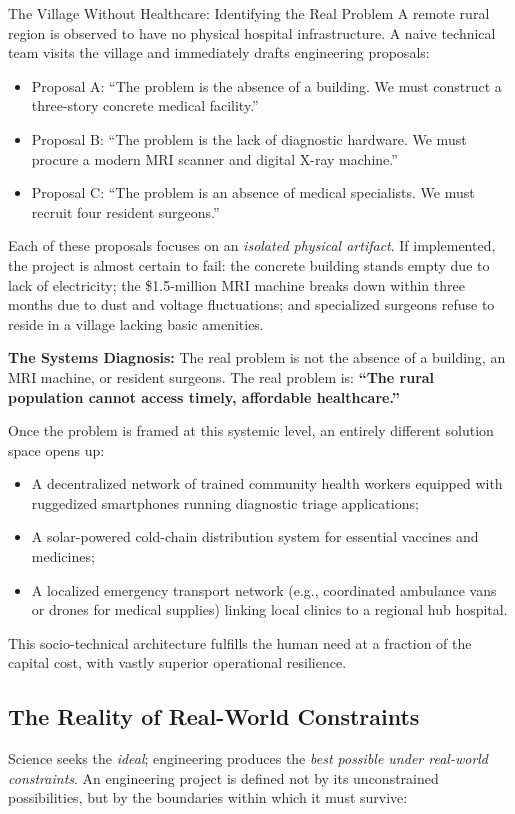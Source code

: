 \begin{storybox}{The Village Without Healthcare: Identifying the Real Problem}
A remote rural region is observed to have no physical hospital infrastructure. 
A naive technical team visits the village and immediately drafts engineering proposals:
\begin{itemize}[leftmargin=1.5em]
    \item Proposal A: ``The problem is the absence of a building. We must construct a three-story concrete medical facility.''
    \item Proposal B: ``The problem is the lack of diagnostic hardware. We must procure a modern MRI scanner and digital X-ray machine.''
    \item Proposal C: ``The problem is an absence of medical specialists. We must recruit four resident surgeons.''
\end{itemize}
Each of these proposals focuses on an \textit{isolated physical artifact}. If implemented, the project is almost certain to fail: the concrete building stands empty due to lack of electricity; the \$1.5-million MRI machine breaks down within three months due to dust and voltage fluctuations; and specialized surgeons refuse to reside in a village lacking basic amenities.

\textbf{The Systems Diagnosis:}
The real problem is not the absence of a building, an MRI machine, or resident surgeons. 
The real problem is: \textbf{``The rural population cannot access timely, affordable healthcare.''}

Once the problem is framed at this systemic level, an entirely different solution space opens up:
\begin{itemize}[leftmargin=1.5em]
    \item A decentralized network of trained community health workers equipped with ruggedized smartphones running diagnostic triage applications;
    \item A solar-powered cold-chain distribution system for essential vaccines and medicines;
    \item A localized emergency transport network (e.g., coordinated ambulance vans or drones for medical supplies) linking local clinics to a regional hub hospital.
\end{itemize}
This socio-technical architecture fulfills the human need at a fraction of the capital cost, with vastly superior operational resilience.
\end{storybox}

\subsection{The Reality of Real-World Constraints}
Science seeks the \textit{ideal}; engineering produces the \textit{best possible under real-world constraints}. An engineering project is defined not by its unconstrained possibilities, but by the boundaries within which it must survive:

